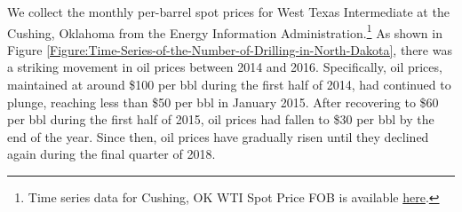 We collect the monthly per-barrel spot prices for West Texas Intermediate at the Cushing, Oklahoma from the Energy Information Administration.\footnote{Time series data for Cushing, OK WTI Spot Price FOB is available \href{https://www.eia.gov/dnav/pet/PET\_PRI\_SPT\_S1\_M.htm}{here}.} As shown in Figure \ref{Figure:Time-Series-of-the-Number-of-Drilling-in-North-Dakota}, there was a striking movement in oil prices between 2014 and 2016. Specifically, oil prices, maintained at around \$100 per bbl during the first half of 2014, had continued to plunge, reaching less than \$50 per bbl in January 2015. After recovering to \$60 per bbl during the first half of 2015, oil prices had fallen to \$30 per bbl by the end of the year. Since then, oil prices have gradually risen until they declined again during the final quarter of 2018.

